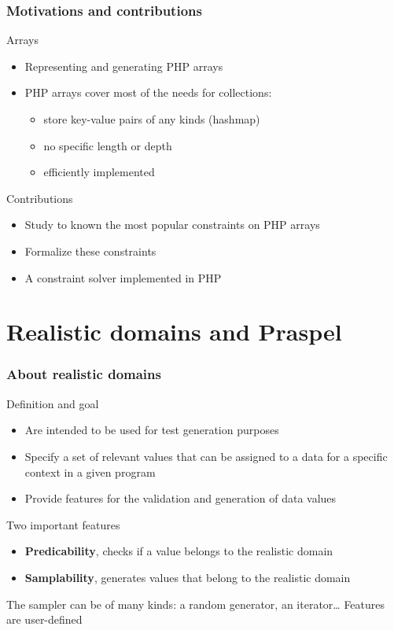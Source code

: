 \documentclass[9pt]{beamer}
\newcommand{\outline}[0]{
  \frame{\frametitle{Outline}\tableofcontents[hideallsubsections]}
}
\newcommand{\outlinereminder}[0]{
  \frame{\frametitle{Outline}
  \tableofcontents[currentsection,subsectionstyle=show/show/hide]}
}
\begin{document}
\begin{frame}
\frametitle{Motivations and contributions}

\begin{block}{Arrays}
\begin{itemize}
\item Representing and generating PHP arrays
\item PHP arrays cover most of the needs for collections:
\begin{itemize}
\item store key-value pairs of any kinds (hashmap)
\item no specific length or depth
\item efficiently implemented
\end{itemize}
\end{itemize}
\end{block}

\begin{block}{Contributions}
\begin{itemize}
\item Study to known the most popular constraints on PHP arrays
\item Formalize these constraints
\item A constraint solver implemented in PHP
\end{itemize}
\end{block}

\end{frame}

\outline

\section[Praspel]{Realistic domains and Praspel}

\outlinereminder

\begin{frame}
\frametitle{About realistic domains}

\begin{block}{Definition and goal}
\begin{itemize}
\item Are intended to be used for test generation purposes
\item Specify a set of relevant values that can be assigned to a data for a
specific context in a given program
\item Provide features for the validation and generation of data values
\end{itemize}
\end{block}

\begin{block}{Two important features}
\begin{itemize}
\item \textbf{Predicability}, checks if a value belongs to the realistic domain
\item \textbf{Samplability}, generates values that belong to the realistic
domain
\end{itemize}
\end{block}
The sampler can be of many kinds: a random generator, an iterator…
Features are user-defined

\end{frame}
\end{document}
